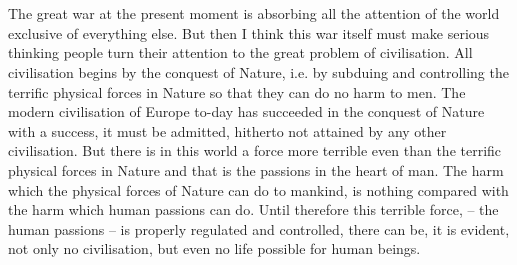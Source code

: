 

\section[The Religion of Good-citizenship]
{}


The great war at the present moment is absorbing all the attention of the world exclusive of everything else. But then I think this war itself must make serious thinking people turn their attention to the great problem of civilisation. All civilisation begins by the conquest of Nature, i.e. by subduing and controlling the terrific physical forces in Nature so that they can do no harm to men. The modern civilisation of Europe to-day has succeeded in the conquest of Nature with a success, it must be admitted, hitherto not attained by any other civilisation. But there is in this world a force more terrible even than the terrific physical forces in Nature and that is the passions in the heart of man. The harm which the physical forces of Nature can do to mankind, is nothing compared with the harm which human passions can do. Until therefore this terrible force,
-- the human passions -- is properly regulated and controlled, there can be, it is evident, not only no civilisation, but even no life possible for human beings.

